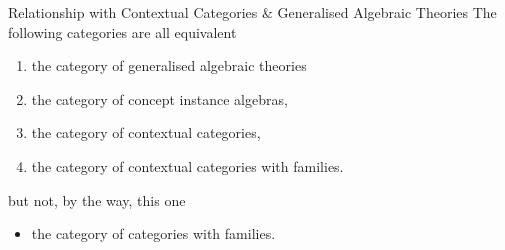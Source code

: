 \begin{frame}{Relationship with Contextual Categories \& Generalised Algebraic Theories}
The following categories are all equivalent
\begin{enumerate}[(1)]
\item the category of generalised algebraic theories
\item the category of concept instance algebras,
\item the category of contextual categories,
\item the category of contextual categories with families.
\end{enumerate}
but not, by the way, this one 
\begin{itemize}
\item the category of categories with families.
\end{itemize}
\end{frame}


\iffalse
\begin{frame}
\begin{displaymath}
\begin{array}{c p{0.1cm} c}
                     && \Rnode{root}{\circ}     \\[0.4cm]
                     && \Rnode{C0}{\cpt_0}         \\[0.4cm]
\Rnode{I0}{\inst_0}      && \Rnode{C1}{\cpt_1}         \\[0.4cm]
\Rnode{I1}{\inst_1}      && \Rnode{C2}{\cpt_2}         \\[0.25cm]
\Rnode{I2}{\inst_2}      && \vdots                  \\[0.25cm]
\vdots			     && \Rnode{Ci}{\cpt_i}         \\[0.4cm]
\Rnode{Ii}{\inst_i}      && \Rnode{Csi}{\cpt_{i+1}}    \\[0.25cm]
\Rnode{Isi}{\inst_{i+1}} && \vdots                  \\[0.25cm]
\vdots               &&
\end{array}
\begin{arrows}
\ncline[nodesep=4pt]{C0}{root}
\ncline[nodesep=4pt]{C1}{C0}
\ncline[nodesep=4pt]{C2}{C1}
\ncline[nodesep=4pt]{Csi}{Ci}
\ncline[nodesep=4pt]{I0}{C0}
\ncline[nodesep=4pt]{I1}{C1}
\ncline[nodesep=4pt]{I2}{C2}
\ncline[nodesep=4pt]{Ii}{Ci}
\ncline[nodesep=4pt]{Isi}{Csi}
\end{arrows}
\end{displaymath}
\end{frame}
\fi

